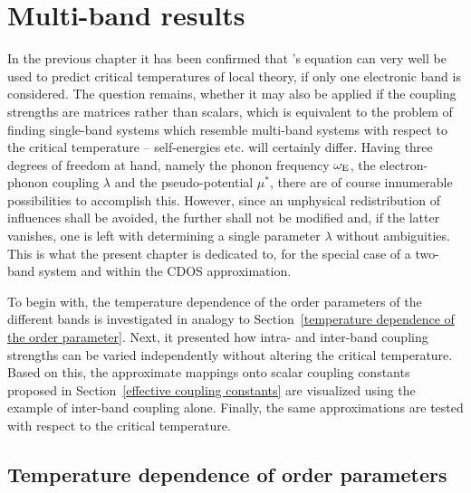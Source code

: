 
\chapter{Multi-band results}
\label{multi-band results}

In the previous chapter it has been confirmed that 's equation
can very well be used to predict critical temperatures of local
 theory, if only one electronic band is considered. The
question remains, whether it may also be applied if the coupling strengths are
matrices rather than scalars, which is equivalent to the problem of finding
single-band systems which resemble multi-band systems with respect to the
critical temperature -- self-energies etc. will certainly differ. Having three
degrees of freedom at hand, namely the phonon frequency $\omega \sb{\text{E}}$, the
electron-phonon coupling $\lambda$ and the  pseudo-potential
$\mu^*$, there are of course innumerable possibilities to accomplish this.
However, since an unphysical redistribution of influences shall be avoided, the
further shall not be modified and, if the latter vanishes, one is left with
determining a single parameter $\lambda$ without ambiguities. This is what the
present chapter is dedicated to, for the special case of a two-band system and
within the CDOS approximation.

To begin with, the temperature dependence of the order parameters of the
different bands is investigated in analogy to Section~\ref{temperature
dependence of the order parameter}. Next, it presented how intra- and inter-band
coupling strengths can be varied independently without altering the critical
temperature. Based on this, the approximate mappings onto scalar coupling
constants proposed in Section~\ref{effective coupling constants} are visualized
using the example of inter-band coupling alone. Finally, the same approximations
are tested with respect to the critical temperature.

\section{Temperature dependence of order parameters}
\label{temperature dependence of order parameters}

